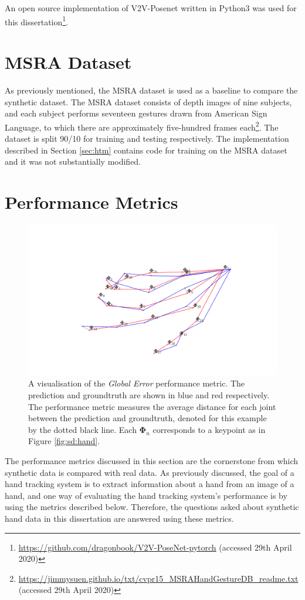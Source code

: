 An open source implementation of V2V-Posenet written in Python3 was used for this dissertation\footnote{\url{https://github.com/dragonbook/V2V-PoseNet-pytorch} (accessed 29th April 2020)}.

\section{MSRA Dataset}
\label{sec:es:msradset}
As previously mentioned, the MSRA dataset\cite{sun2015cascaded} is used as a baseline to compare the synthetic dataset. The MSRA dataset consists of depth images of nine subjects, and each subject performs seventeen gestures drawn from American Sign Language, to which there are approximately five-hundred frames each\footnote{\url{https://jimmysuen.github.io/txt/cvpr15\_MSRAHandGestureDB\_readme.txt} (accessed 29th April 2020)}. The dataset is split 90/10 for training and testing respectively. The implementation described in Section \ref{sec:htm} contains code for training on the MSRA dataset and it was not substantially modified.

\section{Performance Metrics}
\label{sec:pm}
\begin{figure}
    \centering
\includegraphics[width=0.8\linewidth]{figs/general/performance_metric.pdf}
\caption{A visualisation of the {\slshape Global Error} performance metric. The prediction and groundtruth are shown in blue and red respectively. The performance metric measures the average distance for each joint between the prediction and groundtruth, denoted for this example by the dotted black line. Each $\bm{\Phi}_{n}$ corresponds to a keypoint as in Figure \ref{fig:sd:hand}.}
\end{figure}
The performance metrics discussed in this section are the cornerstone from which synthetic data is compared with real data. As previously discussed, the goal of a hand tracking system is to extract information about a hand from an image of a hand, and one way of evaluating the hand tracking system's performance is by using the metrics described below. Therefore, the questions asked about synthetic hand data in this dissertation are answered using these metrics.

